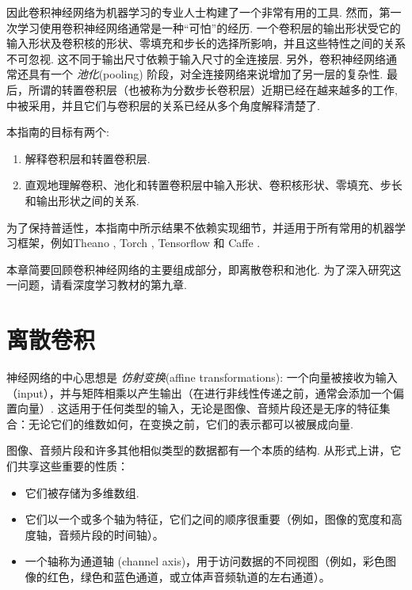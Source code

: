 \documentclass[notitlepage]{ctexrep}
\begin{document}
因此卷积神经网络为机器学习的专业人士构建了一个非常有用的工具. 然而，第一次学习使用卷积神经网络通常是一种``可怕''的经历. 一个卷积层的输出形状受它的输入形状及卷积核的形状、零填充和步长的选择所影响，并且这些特性之间的关系不可忽视. 这不同于输出尺寸依赖于输入尺寸的全连接层. 另外，卷积神经网络通常还具有一个 {\em
池化\/}(pooling) 阶段，对全连接网络来说增加了另一层的复杂性. 最后，所谓的转置卷积层（也被称为分数步长卷积层）近期已经在越来越多的工作\citep{zeiler2011adaptive,zeiler2014visualizing,
long2015fully,radford2015unsupervised,visin15,im2016generating}, 中被采用，并且它们与卷积层的关系已经从多个角度解释清楚了. 

本指南的目标有两个:

\begin{enumerate}
    \item 解释卷积层和转置卷积层.
    \item 直观地理解卷积、池化和转置卷积层中输入形状、卷积核形状、零填充、步长和输出形状之间的关系. 
\end{enumerate}

为了保持普适性，本指南中所示结果不依赖实现细节，并适用于所有常用的机器学习框架，例如Theano
\citep{bergstra2010theano,bastien2012theano}, Torch \citep{collobert2011torch7},
Tensorflow \citep{abaditensorflow} 和 Caffe \citep{jia2014caffe}.

本章简要回顾卷积神经网络的主要组成部分，即离散卷积和池化. 为了深入研究这一问题，请看深度学习教材的第九章\citep{Goodfellow-et-al-2016-Book}.

\section{离散卷积}

神经网络的中心思想是 \emph{仿射变换}(affine transformations): 一个向量被接收为输入（input），并与矩阵相乘以产生输出（在进行非线性传递之前，通常会添加一个偏置向量）. 这适用于任何类型的输入，无论是图像、音频片段还是无序的特征集合：无论它们的维数如何，在变换之前，它们的表示都可以被展成向量.

图像、音频片段和许多其他相似类型的数据都有一个本质的结构. 从形式上讲，它们共享这些重要的性质：

\begin{itemize}
    \item 它们被存储为多维数组.
    \item 它们以一个或多个轴为特征，它们之间的顺序很重要（例如，图像的宽度和高度轴，音频片段的时间轴）。
    \item 一个轴称为通道轴 (channel axis)，用于访问数据的不同视图（例如，彩色图像的红色，绿色和蓝色通道，或立体声音频轨道的左右通道）。 
\end{itemize}
\end{document}
